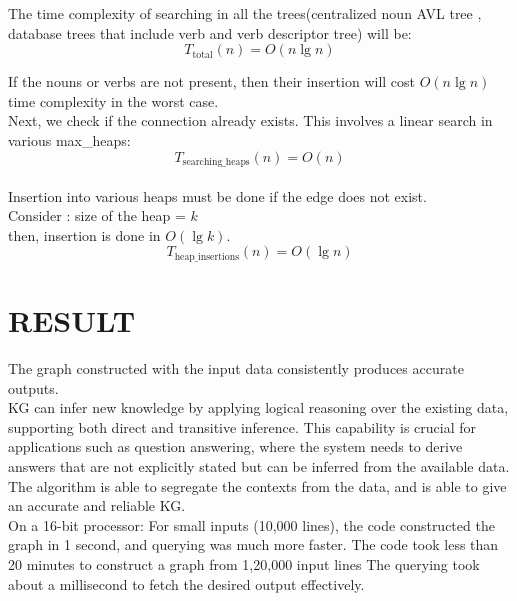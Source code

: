 \documentclass[conference]{IEEEtran}
\begin{document}

The time complexity of searching in all the trees(centralized noun AVL tree , database trees that include verb and verb descriptor tree) will be:
\begin{equation}
	T_{\text{total}}(n) = O(n \lg n)
\end{equation}

If the nouns or verbs are not present, then their insertion  will cost $O(n \lg n)$ time complexity in the worst case.
\\
Next, we check if the connection already exists. This involves a linear search in various max\_heaps:
\begin{equation}
	T_{\text{searching\_heaps}}(n) = O(n)
\end{equation}
\\
Insertion into various heaps must be done if the edge does not exist. \\Consider : size of the heap = $k$
\\then, insertion is done in $O(\lg k)$.
\\
\begin{equation}
	T_{\text{heap\_insertions}}(n) = O(\lg n)
\end{equation}







\section*{RESULT}
The graph constructed with the input data consistently produces accurate outputs.
\\
KG can infer new knowledge by applying logical reasoning over the existing data, supporting both direct and transitive inference. This capability is crucial for applications such as question answering, where the system needs to derive answers that are not explicitly stated but can be inferred from the available data.
\\
The algorithm is able to segregate the contexts from the data, and is able to give an accurate and reliable KG.
\\
On a 16-bit processor:
For small inputs (10,000 lines), the code constructed the graph in 1 second, and querying was much more faster.
The code took less than 20 minutes to construct a graph from 1,20,000 input lines 
The querying took about a millisecond to fetch the desired output effectively.
\end{document}
